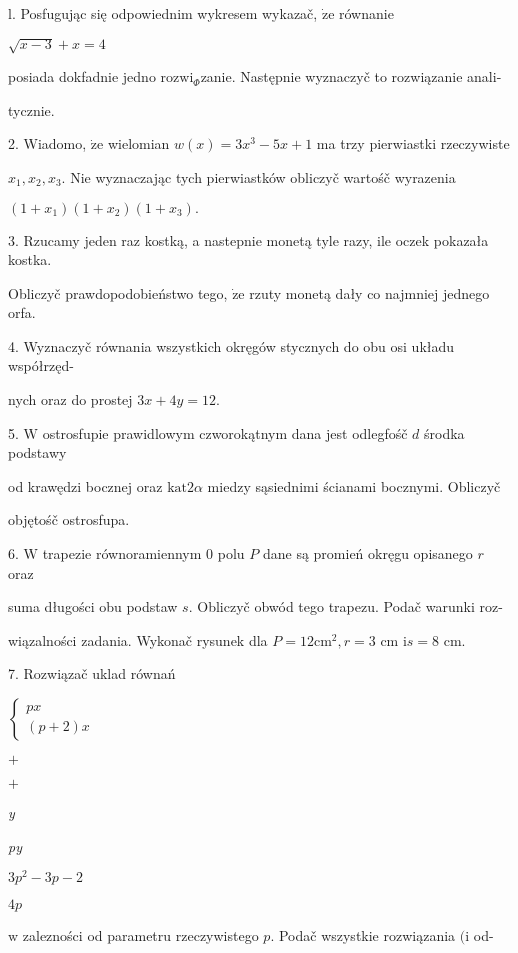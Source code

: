 \documentclass[a4paper,12pt]{article}
\begin{document}
l. Posfugując się odpowiednim wykresem wykazač, $\dot{\mathrm{z}}\mathrm{e}$ równanie

$\sqrt{x-3}+x=4$

posiada dokfadnie jedno $\mathrm{r}\mathrm{o}\mathrm{z}\mathrm{w}\mathrm{i}_{\Phi}$zanie. Następnie wyznaczyč to rozwiązanie anali-

tycznie.

2. Wiadomo, $\dot{\mathrm{z}}\mathrm{e}$ wielomian $w(x) = 3x^{3}-5x+1$ ma trzy pierwiastki rzeczywiste

$x_{1}, x_{2}, x_{3}$. Nie wyznaczając tych pierwiastków obliczyč wartośč wyrazenia

$(1+x_{1})(1+x_{2})(1+x_{3}).$

3. Rzucamy jeden raz kostką, a nastepnie monetą tyle razy, ile oczek pokazała kostka.

Obliczyč prawdopodobieństwo tego, $\dot{\mathrm{z}}\mathrm{e}$ rzuty monetą dały co najmniej jednego orfa.

4. Wyznaczyč równania wszystkich okręgów stycznych do obu osi układu współrzęd-

nych oraz do prostej $3x+4y=12.$

5. $\mathrm{W}$ ostrosfupie prawidlowym czworokątnym dana jest odlegfośč $d$ środka podstawy

od krawędzi bocznej oraz $\mathrm{k}\mathrm{a}\mathrm{t}  2\alpha$ miedzy sąsiednimi ścianami bocznymi. Obliczyč

objętośč ostrosfupa.

6. $\mathrm{W}$ trapezie równoramiennym $0$ polu $P$ dane są promień okręgu opisanego $r$ oraz

suma długości obu podstaw $s$. Obliczyč obwód tego trapezu. Podač warunki roz-

wiązalności zadania. Wykonač rysunek dla $P=12\mathrm{c}\mathrm{m}^{2}, r=3$ cm $\mathrm{i}s=8$ cm.

7. Rozwiązač uklad równań

$\left\{\begin{array}{l}
px\\
(p+2)x
\end{array}\right.$

$+$

$+$

{\it y}

{\it py}

$3p^{2}-3p-2$

$4p$

$\mathrm{w}$ zalezności od parametru rzeczywistego $p$. Podač wszystkie rozwiązania $(\mathrm{i}$ od-
\end{document}
